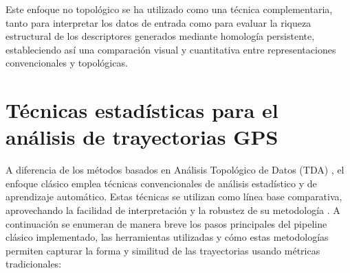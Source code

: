 \vspace{0.2cm}

Este enfoque no topológico se ha utilizado como una técnica complementaria, tanto para interpretar los datos de entrada como para evaluar la riqueza estructural de los descriptores generados mediante homología persistente, estableciendo así una comparación visual y cuantitativa entre representaciones convencionales y topológicas.

\vspace{2cm}

\section{Técnicas estadísticas para el análisis de trayectorias GPS} A diferencia de los métodos basados en Análisis Topológico de Datos (TDA) \cite{chazal2021introduction} \cite{hensel2021survey}, el enfoque clásico emplea técnicas convencionales de análisis estadístico y de aprendizaje automático. Estas técnicas se utilizan como línea base comparativa, aprovechando la facilidad de interpretación y la robustez de su metodología \cite{refBase1}. A continuación se enumeran de manera breve los pasos principales del pipeline clásico implementado, las herramientas utilizadas y cómo estas metodologías permiten capturar la forma y similitud de las trayectorias usando métricas tradicionales:

